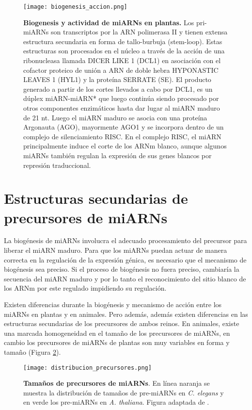 \begin{figure}[htbp!] 
    \centering    
    \texttt{[image: biogenesis\_accion.png]}
    \caption[Biogénesis y actividad de los miARNs en plantas]{
    \textbf{Biogenesis y actividad de miARNs en plantas.}
    Los pri-miARNs son transcriptos por la ARN polimerasa II y tienen extensa estructura secundaria en forma de tallo-burbuja (stem-loop).
    Estas estructuras son procesados en el núcleo a través de la acción de una ribonucleasa llamada DICER LIKE 1 (DCL1) en asociación con el cofactor proteico de unión a ARN de doble hebra HYPONASTIC LEAVES 1 (HYL1) y la proteína SERRATE (SE).
    El producto generado a partir de los cortes llevados a cabo por DCL1, es un dúplex miARN-miARN* que luego continúa siendo procesado por otros componentes enzimáticos hasta dar lugar al miARN maduro de 21 nt.
    Luego el miARN maduro se asocia con una proteína Argonauta (AGO), mayormente AGO1 y se incorpora dentro de un complejo de silenciamiento RISC.
    En el complejo RISC, el miARN principalmente induce el corte de los ARNm blanco, aunque algunos miARNs también regulan la expresión de sus genes blancos por represión traduccional.
    }
    \label{fig:biogenesis_accion}
\end{figure}


\section{Estructuras secundarias de precursores de miARNs}

La biogénesis de miARNs involucra el adecuado procesamiento del precursor para liberar el miARN maduro.
Para que los miARNs puedan actuar de manera correcta en la regulación de la expresión génica, es necesario que el mecanismo de biogénesis sea preciso.
Si el proceso de biogénesis no fuera preciso, cambiaría la secuencia del miARN maduro y por lo tanto el reconocimiento del sitio blanco de los ARNm por este regulado impidiendo su regulación.

Existen diferencias durante la biogénesis y mecanismo de acción entre los miARNs en plantas y en animales.
Pero además, además existen diferencias en las estructuras secundarias de los precursores de ambos reinos.
En animales, existe una marcada homogeneidad en el tamaño de los precursores de miARNs, en cambio los precursores de miARNs de plantas son muy variables en forma y tamaño (Figura \ref{fig:distribucion_precursores}). 

\begin{figure}[htbp!] 
	\centering    
	\texttt{[image: distribucion\_precursores.png]}
	\caption[Tamaños de precursores de miARNs]{
		\textbf{Tamaños de precursores de miARNs}.
		En línea naranja se muestra la distribución de tamaños de pre-miARNs en \textit{C. elegans} y en verde los pre-miARNs en \textit{A. thaliana}.
        Figura adaptada de \citep{Bologna2009}.
	}
	\label{fig:distribucion_precursores}
\end{figure}

